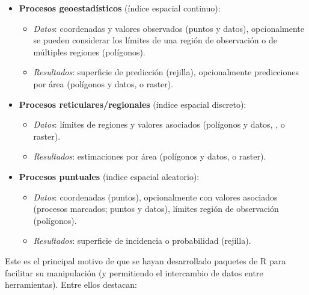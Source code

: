 \documentclass[
]{book}
\theoremstyle{break}
\theoremstyle{definition}
\theoremstyle{definition}
\theoremstyle{definition}
\theoremstyle{definition}
\theoremstyle{remark}
\begin{document}
\begin{itemize}
\item
  \textbf{Procesos geoestadísticos} (índice espacial continuo):

  \begin{itemize}
  \item
    \emph{Datos}: coordenadas y valores observados (puntos y datos), opcionalmente se pueden considerar los límites de una región de observación o de múltiples regiones (polígonos).
  \item
    \emph{Resultados}: superficie de predicción (rejilla),
    opcionalmente predicciones por área (polígonos y datos, o raster).
  \end{itemize}
\item
  \textbf{Procesos reticulares/regionales} (índice espacial discreto):

  \begin{itemize}
  \item
    \emph{Datos}: límites de regiones y valores asociados (polígonos y datos, , o raster).
  \item
    \emph{Resultados}: estimaciones por área (polígonos y datos, o raster).
  \end{itemize}
\item
  \textbf{Procesos puntuales} (indice espacial aleatorio):

  \begin{itemize}
  \item
    \emph{Datos}: coordenadas (puntos), opcionalmente con valores asociados (procesos marcados; puntos y datos),
    límites región de observación (polígonos).
  \item
    \emph{Resultados}: superficie de incidencia o probabilidad (rejilla).
  \end{itemize}
\end{itemize}

Este es el principal motivo de que se hayan desarrollado paquetes de R para facilitar su manipulación (y permitiendo el intercambio de datos entre herramientas).
Entre ellos destacan:
\end{document}
